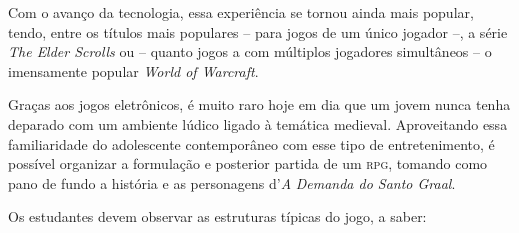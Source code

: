 \documentclass[11pt]{extarticle}
\begin{document}
Com o avanço da tecnologia, essa experiência se tornou ainda mais
popular, tendo, entre os títulos mais populares -- para jogos de um
único jogador --, a série \emph{The Elder Scrolls} ou -- quanto jogos a
com múltiplos jogadores simultâneos -- o imensamente popular \emph{World
of Warcraft}.

Graças aos jogos eletrônicos, é muito raro hoje em dia que um jovem
nunca tenha deparado com um ambiente lúdico ligado à temática medieval.
Aproveitando essa familiaridade do adolescente contemporâneo com esse
tipo de entretenimento, é possível organizar a formulação e posterior
partida de um \textsc{rpg}, tomando como pano de fundo a história e as
personagens d'\emph{A} \emph{Demanda do Santo Graal}.

Os estudantes devem observar as estruturas típicas do jogo, a saber:
\end{document}
